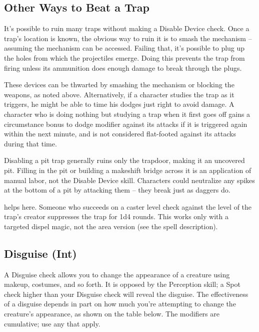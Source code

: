 \begin{figure*}[hbt!]
\subsection{Other Ways to Beat a Trap}
It's possible to ruin many traps without making a Disable Device check.
 Once a trap's location is known, the obvious way to ruin it is to smash the mechanism -- assuming the mechanism can be accessed. Failing that, it's possible to plug up the holes from which the projectiles emerge. Doing this prevents the trap from firing unless its ammunition does enough damage to break through the plugs.

 These devices can be thwarted by smashing the mechanism or blocking the weapons, as noted above. Alternatively, if a character studies the trap as it triggers, he might be able to time his dodges just right to avoid damage. A character who is doing nothing but studying a trap when it first goes off gains a  circumstance bonus to dodge modifier against its attacks if it is triggered again within the next minute, and is not considered flat-footed against its attacks during that time.

 Disabling a pit trap generally ruins only the trapdoor, making it an uncovered pit. Filling in the pit or building a makeshift bridge across it is an application of manual labor, not the Disable Device skill. Characters could neutralize any spikes at the bottom of a pit by attacking them -- they break just as daggers do.

  helps here. Someone who succeeds on a caster level check against the level of the trap's creator suppresses the trap for 1d4 rounds. This works only with a targeted dispel magic, not the area version (see the spell description).
\end{figure*}

\subsection{Disguise (Int)}
 A Disguise check allows you to change the appearance of a creature using makeup, costumes, and so forth. It is opposed by the Perception skill; a Spot check higher than your Disguise check will reveal the disguise. The effectiveness of a disguise depends in part on how much you're attempting to change the creature's appearance, as shown on the table below. The modifiers are cumulative; use any that apply.

